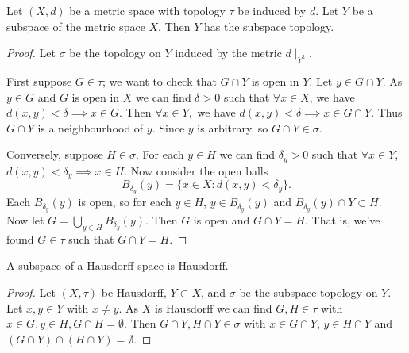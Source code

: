 \begin{proposition}                        %
Let $(X,d)$ be a metric space with topology $\tau$ be induced by $d$. Let $Y$ be a subspace of the metric space $X$. Then $Y$ has the subspace topology.
\end{proposition}  
\begin{proof}
Let $\sigma$ be the topology on $Y$ induced by the metric $d\mid_{Y^2}$. 

First suppose $G\in \tau$; we want to check that $G\cap Y$ is open in $Y$. Let $y\in G\cap Y$. As $y\in G$ and $G$ is open in $X$ we can find $\delta >0$ such that $\forall x\in X$, we have $d(x,y)<\delta \implies x\in G$. Then $\forall x\in Y,$ we have $d(x,y)<\delta \implies x \in G\cap Y$. Thus $G\cap Y$ is a neighbourhood of $y$. Since $y$ is arbitrary, so $G\cap Y\in \sigma$.

Conversely, suppose $H\in \sigma$. For each $y\in H$ we can find $\delta_y>0$ such that $\forall x\in Y$, $d(x,y)<\delta_y\implies x\in H$. Now consider the open balls\[B_{\delta_y}(y) = \{x\in X : d(x,y) < \delta_y\}. \] Each $B_{\delta_y}(y)$ is open, so for each $y\in H$, $y\in B_{\delta_y}(y)$ and $B_{\delta_y}(y)\cap Y\subset H$. Now let $G = \bigcup_{y\in H}B_{\delta_y}(y)$. Then $G$ is open and $G\cap Y= H$. That is, we've found $G\in \tau$ such that $G\cap Y = H$.
\end{proof}

\begin{proposition}                            %
A subspace of a Hausdorff space is Hausdorff.
\end{proposition}
\begin{proof}
Let $(X,\tau)$ be Hausdorff, $Y\subset X$, and $\sigma$ be the subspace topology on $Y$. Let $x,y\in Y$ with $x\neq y$. As $X$ is Hausdorff we can find $G,H\in \tau$ with $x\in G, y\in H, G\cap H = \emptyset$. Then $G\cap Y, H\cap Y \in \sigma$ with $x\in G\cap Y$, $y\in H\cap Y$ and $(G\cap Y)\cap (H\cap Y) = \emptyset$.
\end{proof}

